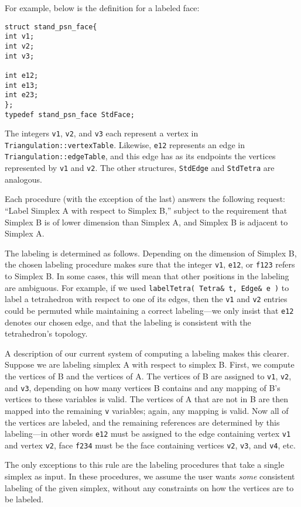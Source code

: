 \documentclass[10pt]{article}%
\begin{document}
For example, below is the definition for a labeled face:
{\small{\begin{verbatim} 
struct stand_psn_face{
int v1;
int v2;
int v3;

int e12;
int e13;
int e23;
};
typedef stand_psn_face StdFace;
\end{verbatim}
}}
The integers \texttt{v1}, \texttt{v2}, and \texttt{v3} each represent a vertex in \texttt{Triangulation::vertexTable}. Likewise, \texttt{e12} represents an edge in \texttt{Triangulation::edgeTable}, and this edge has as its endpoints the vertices represented by \texttt{v1} and \texttt{v2}. The other structures, \texttt{StdEdge} and \texttt{StdTetra} are analogous.

Each procedure (with the exception of the last) answers the following request: ``Label Simplex A with respect to Simplex B,'' subject to the requirement that Simplex B is of lower dimension than Simplex A, and Simplex B is adjacent to Simplex A.

The labeling is determined as follows. Depending on the dimension of Simplex B, the chosen labeling procedure makes sure that the integer \texttt{v1}, \texttt{e12}, or \texttt{f123} refers to Simplex B. In some cases, this will mean that other positions in the labeling are ambiguous. For example, if we used \texttt{labelTetra( Tetra\& t, Edge\& e )} to label a tetrahedron with respect to one of its edges, then the \texttt{v1} and \texttt{v2} entries could be permuted while maintaining a correct labeling---we only insist that \texttt{e12} denotes our chosen edge, and that the labeling is consistent with the tetrahedron's topology.

A description of our current system of computing a labeling makes this clearer. Suppose we are labeling simplex A with respect to simplex B. First, we compute the vertices of B and the vertices of A. The vertices of B are assigned to \texttt{v1}, \texttt{v2}, and \texttt{v3}, depending on how many vertices B contains and any mapping of B's vertices to these variables is valid. The vertices of A that are not in B are then mapped into the remaining \texttt{v} variables; again, any mapping is valid. Now all of the vertices are labeled, and the remaining references are determined by this labeling---in other words \texttt{e12} must be assigned to the edge containing vertex \texttt{v1} and vertex \texttt{v2}, face \texttt{f234} must be the face containing vertices \texttt{v2}, \texttt{v3}, and \texttt{v4}, etc.

The only exceptions to this rule are the labeling procedures that take a single simplex as input. In these procedures, we assume the user wants \textit{some} consistent labeling of the given simplex, without any constraints on how the vertices are to be labeled.
\end{document}
